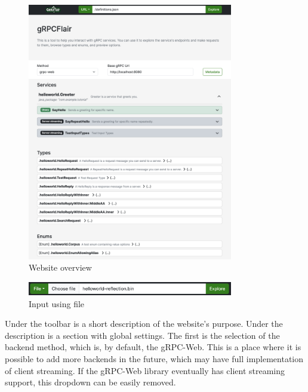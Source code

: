 \begin{figure}[!htb]
    \centering
    \captionsetup{justification=centering}
    \includegraphics[width=0.8\textwidth]{images/implementation/screenshots/fullpage}
    \caption{Website overview}
    \label{fig:implementation-screenshots-fullpage}
\end{figure}

\begin{figure}[!htb]
    \centering
    \captionsetup{justification=centering}
    \includegraphics[width=0.8\textwidth]{images/implementation/screenshots/reflection-input}
    \caption{Input using file}
    \label{fig:implementation-screenshots-reflection-input}
\end{figure}

Under the toolbar is a short description of the website's purpose.
Under the description is a section with global settings.
The first is the selection of the backend method, which is, by default, the gRPC-Web.
This is a place where it is possible to add more backends in the future, which may have full implementation of client streaming.
If the gRPC-Web library eventually has client streaming support, this dropdown can be easily removed.

